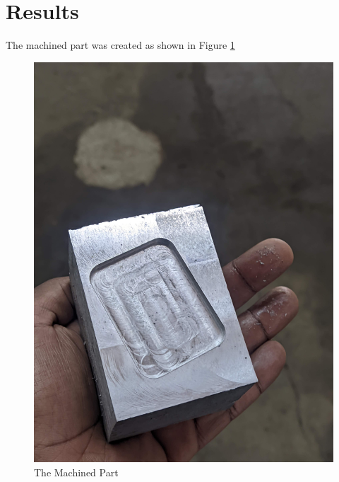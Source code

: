 \section{Results}
The machined part was created as shown in Figure \ref{fig:result}
\begin{figure}[h!]
	\centering
	\includegraphics[width=0.8\linewidth]{Figures/result}
	\caption[Result]{The Machined Part}
	\label{fig:result}
\end{figure}